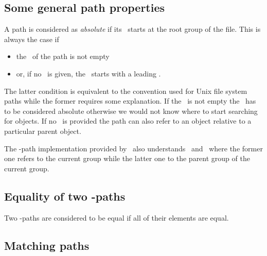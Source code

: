 \subsection{Some general path properties}

A path is considered as \emph{absolute} if its \osection\ starts at the root
group of the file. This is always  the case if 
\begin{itemize}
\item the \fsection\ of the path is not empty
\item or, if no \fsection\ is given, the \osection\ starts with a leading \osep.
\end{itemize}
The latter condition is equivalent to the convention used for Unix file system
paths while the former requires some explanation. 
If the \fsection\ is not empty the \osection\ has to be considered absolute
otherwise we would not know where to start searching for objects. 
If no \fsection\ is provided the path can also refer to an object relative to
a particular parent object.

The \nexus-path implementation provided by \libpniio\ also understands 
\cgroup\ and \pgroup\ where the former one refers to the current group while 
the latter one to the parent group of the current group.

\subsection{Equality of two \nexus-paths}

Two \nexus-paths are considered to be equal if all of their elements are equal.

\subsection{Matching paths}

